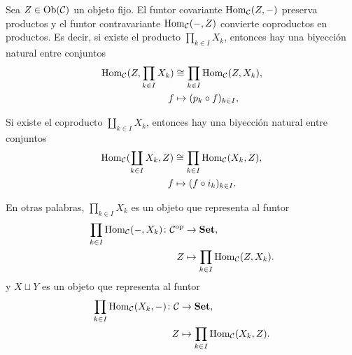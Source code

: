 \documentclass{article}
\numberwithin{equation}{section}
\theoremstyle{definition}
\begin{document}
\begin{observacion}
  \label{hom-y-productos-y-coproductos}
  Sea $Z\in \operatorname{Ob} (\mathcal{C})$ un objeto fijo. El funtor covariante
  $\operatorname{Hom}_\mathcal{C} (Z,-)$ preserva productos y el funtor contravariante
  $\operatorname{Hom}_\mathcal{C} (-,Z)$ convierte coproductos en productos. Es decir, si
  existe el producto $\prod_{k\in I} X_k$, entonces hay una biyección natural
  entre conjuntos
  \begin{align}
    \label{eqn:hom-preserva-productos} \operatorname{Hom}_\mathcal{C} (Z, \prod_{k\in I} X_k) & \cong \prod_{k\in I} \operatorname{Hom}_\mathcal{C} (Z, X_k),\\
    f & \mapsto (p_k\circ f)_{k\in I},\notag
  \end{align}

  Si existe el coproducto $\coprod_{k\in I} X_k$, entonces hay una biyección natural entre conjuntos
  \begin{align}
    \label{eqn:hom-convierte-coproductos-en-productos} \operatorname{Hom}_\mathcal{C} (\coprod_{k\in I} X_k, Z) & \cong \prod_{k\in I} \operatorname{Hom}_\mathcal{C} (X_k, Z),\\
    f & \mapsto (f\circ i_k)_{k\in I}.\notag
  \end{align}

  En otras palabras, $\prod_{k\in I} X_k$ es un objeto que representa al funtor
  \begin{align*}
    \prod_{k\in I} \operatorname{Hom}_\mathcal{C} (-,X_k)\colon \mathcal{C}^\mathrm{op} & \to \text{\bf Set},\\
    Z & \mapsto \prod_{k\in I} \operatorname{Hom}_\mathcal{C} (Z,X_k).
  \end{align*}
  y $X\sqcup Y$ es un objeto que representa al funtor
  \begin{align*}
    \prod_{k\in I} \operatorname{Hom}_\mathcal{C} (X_k,-)\colon \mathcal{C} & \to \text{\bf Set},\\
    Z & \mapsto \prod_{k\in I} \operatorname{Hom}_\mathcal{C} (X_k,Z).
  \end{align*}


\end{observacion}
\end{document}
